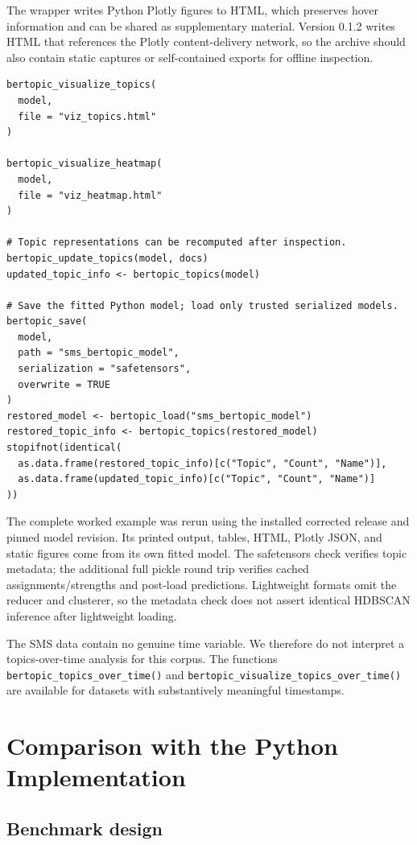 \documentclass[12pt]{article}
\newcommand{\code}[1]{\texttt{#1}}
\begin{document}
The wrapper writes Python Plotly figures to HTML, which preserves hover information and can be shared as supplementary material. Version 0.1.2 writes HTML that references the Plotly content-delivery network, so the archive should also contain static captures or self-contained exports for offline inspection.

\begin{lstlisting}[caption={Creating HTML visualizations and saving the fitted model.}]
bertopic_visualize_topics(
  model,
  file = "viz_topics.html"
)

bertopic_visualize_heatmap(
  model,
  file = "viz_heatmap.html"
)

# Topic representations can be recomputed after inspection.
bertopic_update_topics(model, docs)
updated_topic_info <- bertopic_topics(model)

# Save the fitted Python model; load only trusted serialized models.
bertopic_save(
  model,
  path = "sms_bertopic_model",
  serialization = "safetensors",
  overwrite = TRUE
)
restored_model <- bertopic_load("sms_bertopic_model")
restored_topic_info <- bertopic_topics(restored_model)
stopifnot(identical(
  as.data.frame(restored_topic_info)[c("Topic", "Count", "Name")],
  as.data.frame(updated_topic_info)[c("Topic", "Count", "Name")]
))
\end{lstlisting}

The complete worked example was rerun using the installed corrected release and pinned model revision. Its printed output, tables, HTML, Plotly JSON, and static figures come from its own fitted model. The safetensors check verifies topic metadata; the additional full pickle round trip verifies cached assignments/strengths and post-load predictions. Lightweight formats omit the reducer and clusterer, so the metadata check does not assert identical HDBSCAN inference after lightweight loading.

The SMS data contain no genuine time variable. We therefore do not interpret a topics-over-time analysis for this corpus. The functions \code{bertopic\_topics\_over\_time()} and \code{bertopic\_visualize\_topics\_over\_time()} are available for datasets with substantively meaningful timestamps.

\section{Comparison with the Python Implementation}
\label{sec:evaluation}

\subsection{Benchmark design}
\end{document}
